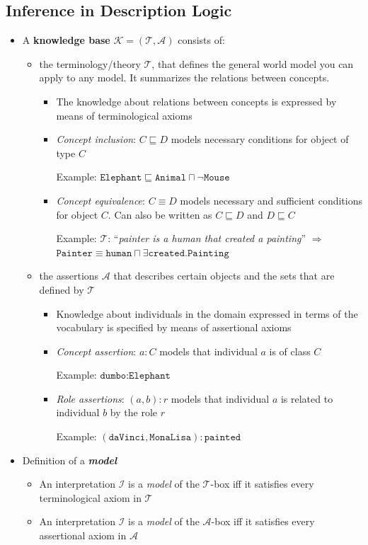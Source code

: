 \subsection{Inference in Description Logic}
\begin{itemize}
	\item A \textbf{knowledge base} $\mathcal{K} = (\mathcal{T}, \mathcal{A}) $ consists of:
	\begin{itemize}
		\item the terminology/theory $\mathcal{T}$, that defines the general world model you can apply to any model. It summarizes the relations between concepts.
		\begin{itemize}
			\item The knowledge about relations between concepts is expressed by means of terminological axioms
			\item \textit{Concept inclusion}: $C\sqsubseteq D$ models necessary conditions for object of type $C$ 
			
			Example: $\texttt{Elephant} \sqsubseteq \texttt{Animal} \sqcap \lnot\texttt{Mouse}$
			\item \textit{Concept equivalence}: $C\equiv D$ models necessary and sufficient conditions for object $C$. Can also be written as $C \sqsubseteq D$ and $D \sqsubseteq C$
			
			Example: $\mathcal{T}$: ``\textit{painter is a human that created a painting}'' $\Rightarrow$ $\texttt{Painter} \equiv \texttt{human}\sqcap \exists\texttt{created}.\texttt{Painting}$
		\end{itemize}
		\item the assertions $\mathcal{A}$ that describes certain objects and the sets that are defined by $\mathcal{T}$
		\begin{itemize}
			\item Knowledge about individuals in the domain expressed in terms of the vocabulary is specified by means of assertional axioms 
			\item \textit{Concept assertion}: $a : C$ models that individual $a$ is of class $C$ 
			
			Example: $\texttt{dumbo}: \texttt{Elephant}$
			\item \textit{Role assertions}: $(a, b) : r$ models that individual $a$ is related to individual $b$ by the role $r$
			
			Example: $(\texttt{daVinci}, \texttt{MonaLisa}) : \texttt{painted}$
		\end{itemize}
	\end{itemize}
	\item Definition of a \textit{\textbf{model}}
	\begin{itemize}
		\item An interpretation $\mathcal{I}$ is a \textit{model} of the $\mathcal{T}$-box iff it satisfies every terminological axiom in $\mathcal{T}$
		\item An interpretation $\mathcal{I}$ is a \textit{model} of the $\mathcal{A}$-box iff it satisfies every assertional axiom in $\mathcal{A}$
		

\end{itemize}
\end{itemize}
